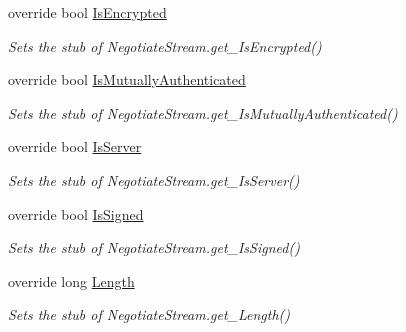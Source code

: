 \begin{DoxyCompactItemize}
override bool \hyperlink{class_system_1_1_net_1_1_security_1_1_fakes_1_1_stub_negotiate_stream_a808dc666a52d7bb2788923be0d7383c6}{Is\-Encrypted}
\begin{DoxyCompactList}\small\item\em Sets the stub of Negotiate\-Stream.\-get\-\_\-\-Is\-Encrypted()\end{DoxyCompactList}\item 
override bool \hyperlink{class_system_1_1_net_1_1_security_1_1_fakes_1_1_stub_negotiate_stream_a15d378082f9ea79970390bf759f8c6ef}{Is\-Mutually\-Authenticated}
\begin{DoxyCompactList}\small\item\em Sets the stub of Negotiate\-Stream.\-get\-\_\-\-Is\-Mutually\-Authenticated()\end{DoxyCompactList}\item 
override bool \hyperlink{class_system_1_1_net_1_1_security_1_1_fakes_1_1_stub_negotiate_stream_a375d975e826c17c5eea34f915036718a}{Is\-Server}
\begin{DoxyCompactList}\small\item\em Sets the stub of Negotiate\-Stream.\-get\-\_\-\-Is\-Server()\end{DoxyCompactList}\item 
override bool \hyperlink{class_system_1_1_net_1_1_security_1_1_fakes_1_1_stub_negotiate_stream_ae95e669ac142d75cbb5af51bc8849d96}{Is\-Signed}
\begin{DoxyCompactList}\small\item\em Sets the stub of Negotiate\-Stream.\-get\-\_\-\-Is\-Signed()\end{DoxyCompactList}\item 
override long \hyperlink{class_system_1_1_net_1_1_security_1_1_fakes_1_1_stub_negotiate_stream_a7844e48f990f5f2c66eb17c6c1def931}{Length}
\begin{DoxyCompactList}\small\item\em Sets the stub of Negotiate\-Stream.\-get\-\_\-\-Length()\end{DoxyCompactList}\item 

\end{DoxyCompactItemize}
